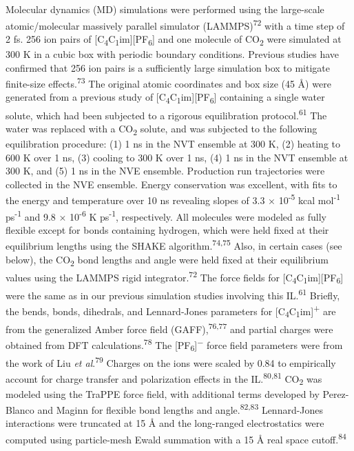 \documentclass[]{article}
\begin{document}
Molecular dynamics (MD) simulations were performed using the large-scale
atomic/molecular massively parallel simulator
(LAMMPS)\textsuperscript{72} with a time step of 2 fs. 256 ion pairs of
{[}C\textsubscript{4}C\textsubscript{1}im{]}{[}PF\textsubscript{6}{]}
and one molecule of CO\textsubscript{2} were simulated at 300 K in a
cubic box with periodic boundary conditions. Previous studies have
confirmed that 256 ion pairs is a sufficiently large simulation box to
mitigate finite-size effects.\textsuperscript{73} The original atomic
coordinates and box size (45 Å) were generated from a previous study of
{[}C\textsubscript{4}C\textsubscript{1}im{]}{[}PF\textsubscript{6}{]}
containing a single water solute, which had been subjected to a rigorous
equilibration protocol.\textsuperscript{61} The water was replaced with
a CO\textsubscript{2} solute, and was subjected to the following
equilibration procedure: (1) 1 ns in the NVT ensemble at 300 K, (2)
heating to 600 K over 1 ns, (3) cooling to 300 K over 1 ns, (4) 1 ns in
the NVT ensemble at 300 K, and (5) 1 ns in the NVE ensemble. Production
run trajectories were collected in the NVE ensemble. Energy conservation
was excellent, with fits to the energy and temperature over 10 ns
revealing slopes of 3.3 × 10\textsuperscript{-5} kcal
mol\textsuperscript{-1} ps\textsuperscript{-1} and 9.8 ×
10\textsuperscript{-6} K ps\textsuperscript{-1}, respectively. All
molecules were modeled as fully flexible except for bonds containing
hydrogen, which were held fixed at their equilibrium lengths using the
SHAKE algorithm.\textsuperscript{74,75} Also, in certain cases (see
below), the CO\textsubscript{2} bond lengths and angle were held fixed
at their equilibrium values using the LAMMPS rigid
integrator.\textsuperscript{72} The force fields for
{[}C\textsubscript{4}C\textsubscript{1}im{]}{[}PF\textsubscript{6}{]}
were the same as in our previous simulation studies involving this
IL.\textsuperscript{61} Briefly, the bends, bonds, dihedrals, and
Lennard-Jones parameters for
{[}C\textsubscript{4}C\textsubscript{1}im{]}\textsuperscript{+} are from
the generalized Amber force field (GAFF),\textsuperscript{76,77} and
partial charges were obtained from DFT calculations.\textsuperscript{78}
The {[}PF\textsubscript{6}{]}\textsuperscript{−} force field parameters
were from the work of Liu \emph{et al}.\textsuperscript{79} Charges on
the ions were scaled by 0.84 to empirically account for charge transfer
and polarization effects in the IL.\textsuperscript{80,81}
CO\textsubscript{2} was modeled using the TraPPE force field, with
additional terms developed by Perez-Blanco and Maginn for flexible bond
lengths and angle.\textsuperscript{82,83} Lennard-Jones interactions
were truncated at 15 Å and the long-ranged electrostatics were computed
using particle-mesh Ewald summation with a 15 Å real space
cutoff.\textsuperscript{84}
\end{document}
